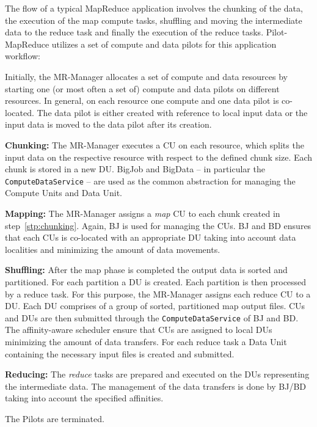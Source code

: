 \documentclass[12pt]{report}
\newcommand{\upp}{\vspace*{-0.5em}}
\newcommand{\pilots}{Pilots\xspace}
\newcommand{\pilotmapreduce}{Pilot-MapReduce\xspace}
\newcommand{\computeunits}{Compute Units\xspace}
\newcommand{\cu}{CU\xspace}
\newcommand{\cus}{CUs\xspace}
\newcommand{\mrmg}{MR-Manager\xspace}
\newcommand{\dataunits}{Data Unit\xspace}
\newcommand{\du}{DU\xspace}
\newcommand{\dus}{DUs\xspace}
\begin{document}
The flow of a typical MapReduce application involves the chunking of
the data, the execution of the map compute tasks, shuffling and moving
the intermediate data to the reduce task and finally the execution of
the reduce tasks.  \pilotmapreduce utilizes a set of compute and data
pilots for this application workflow: 
\upp
\begin{compactenum}[A.]
\item Initially, the \mrmg allocates a set of compute and data
  resources by starting one (or most often a set of) compute and data
  pilots on different resources.  In general, on each resource one
  compute and one data pilot is co-located. The data pilot is either
  created with reference to local input data or the input data is
  moved to the data pilot after its creation.


\item \textbf{Chunking:} %
The \mrmg executes a \cu on each resource, which splits the
input data on the respective resource with respect to the defined chunk
size.\label{stp:chunking} 
Each chunk is stored in a new DU. BigJob and BigData -- in particular
the \texttt{ComputeDataService} -- are used as the common abstraction
for managing the \computeunits and \dataunits. 
  

\item \textbf{Mapping:} The \mrmg assigns a {\it map} CU to each
  chunk created in step~\ref{stp:chunking}. Again, BJ is used for
  managing the CUs. BJ and BD ensures that each CUs is co-located with
  an appropriate DU taking into account data localities and minimizing
  the amount of data movements.

\item \textbf{Shuffling:} 
  After the map phase is completed the output data is sorted and
  partitioned. For each partition a \du is created. Each partition is
  then processed by a reduce task. For this purpose, the \mrmg assigns
  each reduce CU to a DU. Each DU comprises of a group of sorted,
  partitioned map output files. \cus and \dus are then submitted
  through the \texttt{ComputeDataService} of BJ and BD. The
  affinity-aware scheduler ensure that \cus are assigned to local \dus
  minimizing the amount of data transfers. 	For each reduce task a 
  Data Unit containing the necessary input files is created and submitted. %



	
\item \textbf{Reducing:} The {\it reduce} tasks are prepared and
  executed on the DUs representing the intermediate data.
  The management of the data transfers is done by BJ/BD taking into account the 
  specified affinities.
	
\item The \pilots are terminated.

\end{compactenum}
\upp
\end{document}

